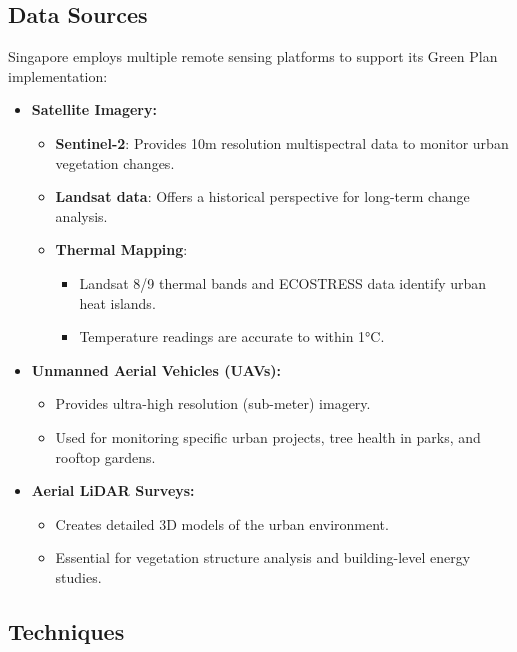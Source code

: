 \documentclass[
  letterpaper,
  DIV=11,
  numbers=noendperiod]{scrreprt}
\providecommand{\tightlist}{%
  \setlength{\itemsep}{0pt}\setlength{\parskip}{0pt}}\usepackage{longtable,booktabs,array}
\begin{document}
\subsection{Data Sources}\label{data-sources}

Singapore employs multiple remote sensing platforms to support its Green
Plan implementation:

\begin{itemize}
\tightlist
\item
  \textbf{Satellite Imagery:}

  \begin{itemize}
  \tightlist
  \item
    \textbf{Sentinel-2}: Provides 10m resolution multispectral data to
    monitor urban vegetation changes.
  \item
    \textbf{Landsat data}: Offers a historical perspective for long-term
    change analysis.
  \item
    \textbf{Thermal Mapping}:

    \begin{itemize}
    \tightlist
    \item
      Landsat 8/9 thermal bands and ECOSTRESS data identify urban heat
      islands.
    \item
      Temperature readings are accurate to within 1°C.
    \end{itemize}
  \end{itemize}
\item
  \textbf{Unmanned Aerial Vehicles (UAVs):}

  \begin{itemize}
  \tightlist
  \item
    Provides ultra-high resolution (sub-meter) imagery.
  \item
    Used for monitoring specific urban projects, tree health in parks,
    and rooftop gardens.
  \end{itemize}
\item
  \textbf{Aerial LiDAR Surveys:}

  \begin{itemize}
  \tightlist
  \item
    Creates detailed 3D models of the urban environment.
  \item
    Essential for vegetation structure analysis and building-level
    energy studies.
  \end{itemize}
\end{itemize}

\subsection{Techniques}\label{techniques}
\end{document}
